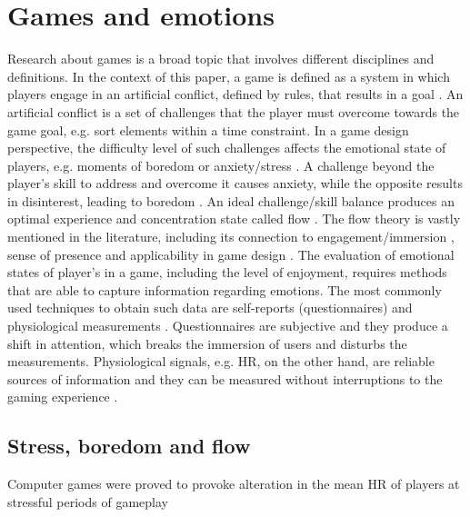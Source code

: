 \chapter{Games and emotions}

Research about games is a broad topic that involves different disciplines and definitions. In the context of this paper, a game is defined as a system in which players engage in an artificial conflict, defined by rules, that results in a goal \parencite{salen2004rules}. An artificial conflict is a set of challenges that the player must overcome towards the game goal, e.g. sort elements within a time constraint. In a game design perspective, the difficulty level of such challenges affects the emotional state of players, e.g. moments of boredom or anxiety/stress \parencite{schell2014art}. A challenge beyond the player's skill to address and overcome it causes anxiety, while the opposite results in disinterest, leading to boredom \parencite{chen2007flow}. An ideal challenge/skill balance produces an optimal experience and concentration state called flow \parencite{csikszentmihalyi1990psychology}. The flow theory is vastly mentioned in the literature, including its connection to engagement/immersion \parencite{brown2004grounded}, sense of presence \parencite{weibel2011immersion} and applicability in game design \parencite{cruz2017player, sweetser2005gameflow}. The evaluation of emotional states of player's in a game, including the level of enjoyment, requires methods that are able to capture information regarding emotions. The most commonly used techniques to obtain such data are self-reports (questionnaires) and physiological measurements \parencite{mekler2014systematic}. Questionnaires are subjective and they produce a shift in attention, which breaks the immersion of users and disturbs the measurements. Physiological signals, e.g. HR, on the other hand, are reliable sources of information and they can be measured without interruptions to the gaming experience \parencite{bousefsaf2013remote,yun2009game,rani2006empirical,tijs2008dynamic}.

\section{Stress, boredom and flow}

Computer games were proved to provoke alteration in the mean HR of players at stressful periods of gameplay \parencite{sharma2006assessment,rodriguez2015vr}



